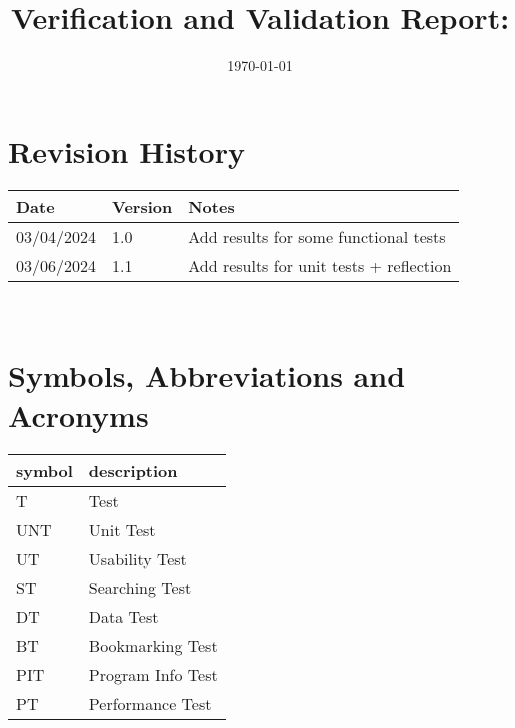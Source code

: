 \documentclass[12pt, titlepage]{article}
\begin{document}
\title{Verification and Validation Report: \progname} 
\author{\authname}
\date{\today}
	
\maketitle


\section{Revision History}

\begin{tabularx}{\textwidth}{p{3cm}p{2cm}X}
\toprule {\bf Date} & {\bf Version} & {\bf Notes}\\
\midrule
03/04/2024 & 1.0 & Add results for some functional tests\\
03/06/2024 & 1.1 & Add results for unit tests + reflection\\
\bottomrule
\end{tabularx}

~\newpage

\section{Symbols, Abbreviations and Acronyms}

\renewcommand{\arraystretch}{1.2}
\begin{tabular}{l l} 
  \toprule		
  \textbf{symbol} & \textbf{description}\\
  \midrule 
  T & Test\\
  UNT & Unit Test\\
  UT & Usability Test\\
  ST & Searching Test\\
  DT & Data Test\\
  BT & Bookmarking Test\\
  PIT & Program Info Test\\
  PT & Performance Test\\
  \bottomrule
\end{tabular}\\


\newpage

\tableofcontents

\listoftables %

\listoffigures %
\end{document}
